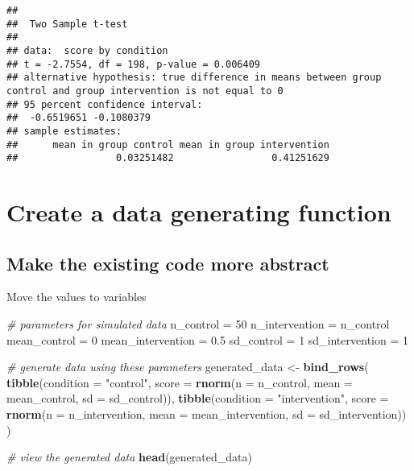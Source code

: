 \documentclass[
]{article}
\newenvironment{Shaded}{\begin{snugshade}}{\end{snugshade}}
\newcommand{\AttributeTok}[1]{\textcolor[rgb]{0.13,0.29,0.53}{#1}}
\newcommand{\CommentTok}[1]{\textcolor[rgb]{0.56,0.35,0.01}{\textit{#1}}}
\newcommand{\DecValTok}[1]{\textcolor[rgb]{0.00,0.00,0.81}{#1}}
\newcommand{\FloatTok}[1]{\textcolor[rgb]{0.00,0.00,0.81}{#1}}
\newcommand{\FunctionTok}[1]{\textcolor[rgb]{0.13,0.29,0.53}{\textbf{#1}}}
\newcommand{\NormalTok}[1]{#1}
\newcommand{\OtherTok}[1]{\textcolor[rgb]{0.56,0.35,0.01}{#1}}
\newcommand{\StringTok}[1]{\textcolor[rgb]{0.31,0.60,0.02}{#1}}
\begin{document}
\begin{verbatim}
## 
##  Two Sample t-test
## 
## data:  score by condition
## t = -2.7554, df = 198, p-value = 0.006409
## alternative hypothesis: true difference in means between group control and group intervention is not equal to 0
## 95 percent confidence interval:
##  -0.6519651 -0.1080379
## sample estimates:
##      mean in group control mean in group intervention 
##                 0.03251482                 0.41251629
\end{verbatim}

\hypertarget{create-a-data-generating-function}{%
\section{Create a data generating
function}\label{create-a-data-generating-function}}

\hypertarget{make-the-existing-code-more-abstract}{%
\subsection{Make the existing code more
abstract}\label{make-the-existing-code-more-abstract}}

Move the values to variables

\begin{Shaded}
\begin{Highlighting}[]
\CommentTok{\# parameters for simulated data}
\NormalTok{n\_control }\OtherTok{=} \DecValTok{50}
\NormalTok{n\_intervention }\OtherTok{=}\NormalTok{ n\_control}
\NormalTok{mean\_control }\OtherTok{=} \DecValTok{0}
\NormalTok{mean\_intervention }\OtherTok{=} \FloatTok{0.5}
\NormalTok{sd\_control }\OtherTok{=} \DecValTok{1}
\NormalTok{sd\_intervention }\OtherTok{=} \DecValTok{1}

\CommentTok{\# generate data using these parameters}
\NormalTok{generated\_data }\OtherTok{\textless{}{-}} 
  \FunctionTok{bind\_rows}\NormalTok{(}
    \FunctionTok{tibble}\NormalTok{(}\AttributeTok{condition =} \StringTok{"control"}\NormalTok{,}
           \AttributeTok{score =} \FunctionTok{rnorm}\NormalTok{(}\AttributeTok{n =}\NormalTok{ n\_control, }\AttributeTok{mean =}\NormalTok{ mean\_control, }\AttributeTok{sd =}\NormalTok{ sd\_control)),}
    \FunctionTok{tibble}\NormalTok{(}\AttributeTok{condition =} \StringTok{"intervention"}\NormalTok{,}
           \AttributeTok{score =} \FunctionTok{rnorm}\NormalTok{(}\AttributeTok{n =}\NormalTok{ n\_intervention, }\AttributeTok{mean =}\NormalTok{ mean\_intervention, }\AttributeTok{sd =}\NormalTok{ sd\_intervention))}
\NormalTok{  ) }

\CommentTok{\# view the generated data}
\FunctionTok{head}\NormalTok{(generated\_data)}
\end{Highlighting}
\end{Shaded}
\end{document}
